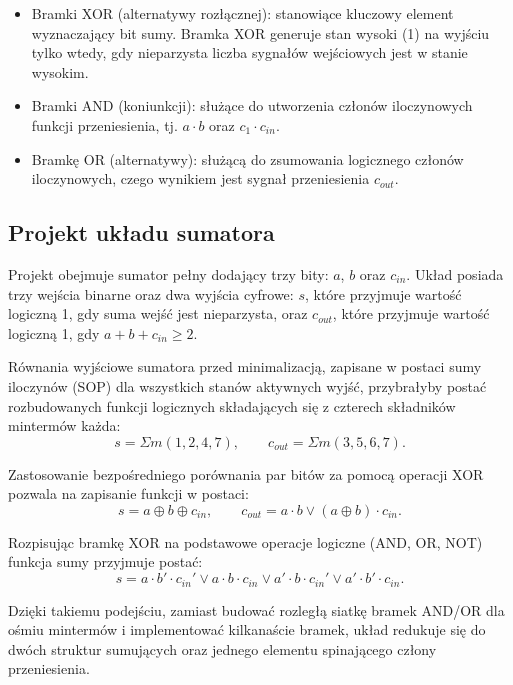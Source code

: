 \documentclass[12pt,a4paper]{article}
\begin{document}
\begin{itemize}
    \item Bramki XOR (alternatywy rozłącznej): stanowiące kluczowy element wyznaczający bit sumy. Bramka XOR generuje stan wysoki (1) na wyjściu tylko wtedy, gdy nieparzysta liczba sygnałów wejściowych jest w stanie wysokim.
    \item Bramki AND (koniunkcji): służące do utworzenia członów iloczynowych funkcji przeniesienia, tj. $a \cdot b$ oraz $c_1 \cdot c_{in}$.
    \item Bramkę OR (alternatywy): służącą do zsumowania logicznego członów iloczynowych, czego wynikiem jest sygnał przeniesienia $c_{out}$.
\end{itemize}

\subsection{Projekt układu sumatora}

Projekt obejmuje sumator pełny dodający trzy bity: $a$, $b$ oraz $c_{in}$. Układ posiada trzy wejścia binarne oraz dwa wyjścia cyfrowe: $s$, które przyjmuje wartość logiczną 1, gdy suma wejść jest nieparzysta, oraz $c_{out}$, które przyjmuje wartość logiczną 1, gdy $a + b + c_{in} \geq 2$.

Równania wyjściowe sumatora przed minimalizacją, zapisane w postaci sumy iloczynów (SOP) dla wszystkich stanów aktywnych wyjść, przybrałyby postać rozbudowanych funkcji logicznych składających się z czterech składników mintermów każda:
\begin{equation*}
s = \Sigma m(1, 2, 4, 7), \qquad c_{out} = \Sigma m(3, 5, 6, 7).
\end{equation*}

Zastosowanie bezpośredniego porównania par bitów za pomocą operacji XOR pozwala na zapisanie funkcji w postaci:
\begin{equation*}
s = a \oplus b \oplus c_{in}, \qquad c_{out} = a \cdot b \vee (a \oplus b) \cdot c_{in}.
\end{equation*}

Rozpisując bramkę XOR na podstawowe operacje logiczne (AND, OR, NOT) funkcja sumy przyjmuje postać:
\begin{equation*}
s = a \cdot b' \cdot c_{in}' \vee a \cdot b \cdot c_{in} \vee a' \cdot b \cdot c_{in}' \vee a' \cdot b' \cdot c_{in}.
\end{equation*}

Dzięki takiemu podejściu, zamiast budować rozległą siatkę bramek AND/OR dla ośmiu mintermów i implementować kilkanaście bramek, układ redukuje się do dwóch struktur sumujących oraz jednego elementu spinającego człony przeniesienia.
\end{document}
